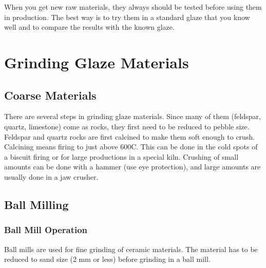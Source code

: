When you get new raw materials, they always should be tested before using them 
in production. The best way is to try them in a standard glaze that you know 
well and to compare the results with the known glaze.
\section{Grinding Glaze Materials}
\subsection{Coarse Materials}
There are several steps in grinding glaze materials. Since many of them 
(feldspar, quartz, limestone) come as rocks, they first need to be reduced to 
pebble size. Feldspar and quartz rocks are first calcined to make them soft 
enough to crush. Calcining means firing to just above 600\degree C. This can be 
done 
in the cold spots of a biscuit firing or for large productions in a special 
kiln. Crushing of small amounts can be done with a hammer (use eye protection), 
and large amounts are usually done in a jaw crusher.
\subsection{Ball Milling}
\subsubsection{Ball Mill Operation}
Ball mills are used for fine grinding of ceramic materials. The material has to 
be reduced to sand size (2 mm or less) before grinding in a ball mill.

